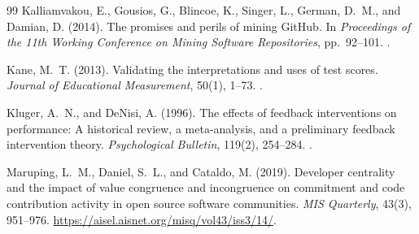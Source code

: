 \begin{thebibliography}{99}
Kalliamvakou, E., Gousios, G., Blincoe, K., Singer, L., German, D.~M., and Damian, D. (2014).
The promises and perils of mining GitHub.
In \emph{Proceedings of the 11th Working Conference on Mining Software Repositories}, pp.~92--101.
.

Kane, M.~T. (2013).
Validating the interpretations and uses of test scores.
\emph{Journal of Educational Measurement}, 50(1), 1--73.
.

Kluger, A.~N., and DeNisi, A. (1996).
The effects of feedback interventions on performance: A historical review, a meta-analysis, and a preliminary feedback intervention theory.
\emph{Psychological Bulletin}, 119(2), 254--284.
.

Maruping, L.~M., Daniel, S.~L., and Cataldo, M. (2019).
Developer centrality and the impact of value congruence and incongruence on commitment and code contribution activity in open source software communities.
\emph{MIS Quarterly}, 43(3), 951--976.
\url{https://aisel.aisnet.org/misq/vol43/iss3/14/}.

\end{thebibliography}
\clearpage
\begingroup
\renewcommand{\bibsection}{\section*{References\enspace{\normalfont\sffamily\fontsize{11}{14}\selectfont continued}}}
